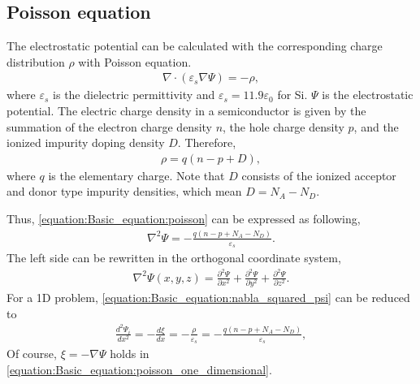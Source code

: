 \documentclass[letterpaper,10pt,english]{sphinxmanual}
\numberwithin{equation}{section}
\begin{document}
\subsection{Poisson equation}
\label{\detokenize{Basic_equation:poisson-equation}}
\sphinxAtStartPar
The electrostatic potential can be calculated with the corresponding charge distribution \(\rho\) with Poisson equation.
\begin{equation}\label{equation:Basic_equation:poisson}
\begin{split}\nabla \cdot \left(\varepsilon_s \nabla\Psi\right) = -\rho,\end{split}
\end{equation}
\sphinxAtStartPar
where \(\varepsilon_s\) is the dielectric permittivity and \(\varepsilon_s = 11.9 \varepsilon_0\) for Si.
\(\Psi\) is the electrostatic potential.
The electric charge density in a semiconductor is given by the summation of the electron charge density \(n\), the hole charge density \(p\), and the ionized impurity doping density \(D\).
Therefore,
\begin{equation}\label{equation:Basic_equation:electric_charge}
\begin{split}\rho = q(n - p + D),\end{split}
\end{equation}
\sphinxAtStartPar
where \(q\) is the elementary charge.
Note that \(D\) consists of the ionized acceptor and donor type impurity densities, which mean \(D = N_A - N_D\).

\sphinxAtStartPar
Thus, \eqref{equation:Basic_equation:poisson} can be expressed as following,
\begin{equation}\label{equation:Basic_equation:poisson_electric_charge}
\begin{split}\nabla^2\Psi = -\frac{q(n - p + N_A - N_D)}{\varepsilon_s}.\end{split}
\end{equation}
\sphinxAtStartPar
The left side can be rewritten in the orthogonal coordinate system,
\begin{equation}\label{equation:Basic_equation:nabla_squared_psi}
\begin{split}\nabla^2\Psi(x, y, z) = \frac{\partial^2\Psi}{\partial x^2} + \frac{\partial^2\Psi}{\partial y^2} + \frac{\partial^2\Psi}{\partial z^2}.\end{split}
\end{equation}
\sphinxAtStartPar
For a 1D problem, \eqref{equation:Basic_equation:nabla_squared_psi} can be reduced to
\begin{equation}\label{equation:Basic_equation:poisson_one_dimensional}
\begin{split}\frac{d^2\Psi_i}{d x^2} = -\frac{d\xi}{dx} = -\frac{\rho}{\varepsilon_s} =  -\frac{q(n - p + N_A - N_D)}{\varepsilon_s},\end{split}
\end{equation}
\sphinxAtStartPar
Of course, \(\xi = - \nabla\Psi\) holds in \eqref{equation:Basic_equation:poisson_one_dimensional}.
\end{document}
